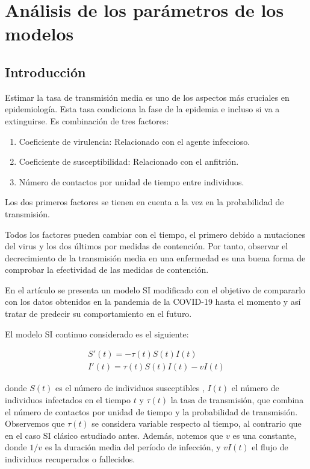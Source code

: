  







\section{Análisis de los parámetros de los modelos}

\subsection{Introducción}

Estimar la tasa de transmisión media es uno de los aspectos más cruciales en epidemiología. Esta tasa condiciona la fase de la epidemia e incluso si va a extinguirse. Es combinación de tres factores:

\begin{enumerate}
\item Coeficiente de virulencia: Relacionado con el agente infeccioso.
\item Coeficiente de susceptibilidad: Relacionado con el anfitrión.
\item Número de contactos por unidad de tiempo entre individuos.
\end{enumerate}

Los dos primeros factores se tienen en cuenta a la vez en la probabilidad de transmisión.

Todos los factores pueden cambiar con el tiempo, el primero debido a mutaciones del virus y los dos últimos por medidas de contención. Por tanto, observar el decrecimiento de la transmisión media en una enfermedad es una buena forma de comprobar la efectividad de las medidas de contención.

En el artículo \cite{demongeotSIEpidemicModel} se presenta un modelo SI modificado con el objetivo de compararlo con los datos obtenidos en la pandemia de la COVID-19 hasta el momento y así tratar de predecir su comportamiento en el futuro.

El modelo SI continuo considerado es el siguiente:

\begin{equation}
\label{eqn: SI_cont}
\begin{aligned}
S'(t) = -\tau (t)S(t)I(t) \\
I'(t) = \tau (t)S(t)I(t) -vI(t)
\end{aligned}
\end{equation}

donde $S(t)$ es el número de individuos susceptibles , $I(t)$ el número de individuos infectados en el tiempo $t$ y $\tau (t)$ la tasa de transmisión, que combina el número de contactos por unidad de tiempo y la probabilidad de transmisión. Observemos que $\tau (t)$ se considera variable respecto al tiempo, al contrario que en el caso SI clásico estudiado antes. Además, notemos que $v$ es una constante, donde $1/v$ es la duración media del período de infección, y $vI(t)$ el flujo de individuos recuperados o fallecidos. %

